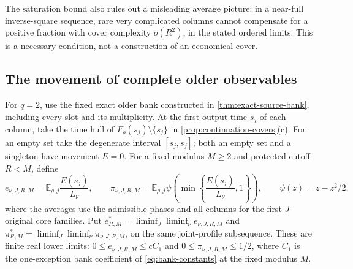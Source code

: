 The saturation bound also rules out a misleading average picture:
in a near-full inverse-square sequence, rare very complicated columns
cannot compensate for a positive fraction with cover complexity
$o(R^2)$, in the stated ordered limits. This is a necessary condition,
not a construction of an economical cover.

\subsection{The movement of complete older observables}

For $q=2$, use the fixed exact older bank constructed in
\cref{thm:exact-source-bank}, including every slot and its multiplicity.
At the first output time $s_j$ of each column, take the time hull of
$F_\rho(s_j)\setminus\{s_j\}$ in \cref{prop:continuation-covers}(c).
For an empty set take the degenerate interval $[s_j,s_j]$; both an
empty set and a singleton have movement $E=0$.
For a fixed modulus $M\ge2$ and protected cutoff $R<M$, define
\[
 e_{\nu,J,R,M}=\mathbb E_{\rho,j}\frac{E(s_j)}{L_\nu},
 \qquad
 \pi_{\nu,J,R,M}=\mathbb E_{\rho,j}
   \psi\!\left(\min\!\left\{\frac{E(s_j)}{L_\nu},1\right\}\right),
 \qquad \psi(z)=z-z^2/2,
\]
where the averages use the admissible phases and all columns for the
first $J$ original core families. Put
$e^*_{R,M}=\liminf_J\liminf_\nu e_{\nu,J,R,M}$ and
$\pi^*_{R,M}=\liminf_J\liminf_\nu\pi_{\nu,J,R,M}$, on the same
joint-profile subsequence. These are finite real lower limits:
$0\le e_{\nu,J,R,M}\le cC_1$ and
$0\le\pi_{\nu,J,R,M}\le1/2$, where $C_1$ is the one-exception bank
coefficient of \cref{eq:bank-constants} at the fixed modulus $M$.

